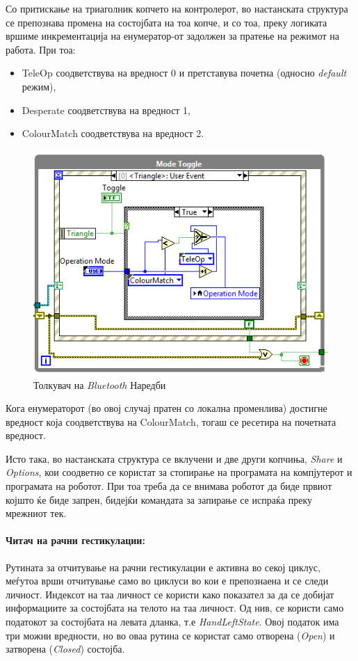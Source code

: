 \documentclass[12pt]{article}
\begin{document}
      Со притискање на триаголник копчето на контролерот, во настанската структура се препознава промена на состојбата на тоа копче, и со тоа, преку логиката вршиме инкрементација на енумератор-от задолжен за пратење на режимот на работа. При тоа:

      \begin{itemize}
        \item TeleOp соодветствува на вредност 0 и претставува почетна (односно \textit{default} режим),
        \item Desperate соодветствува на вредност 1,
        \item ColourMatch соодветствува на вредност 2.
        \end{itemize}

      \begin{figure}[H]
        \centering
        \includegraphics[width=0.75\linewidth]{./images/mode_switch.png}
        \caption{Толкувач на \textit{Bluetooth} Наредби}
        \end{figure}

      Кога енумераторот (во овој случај пратен со локална променлива) достигне вредност која соодветствува на ColourMatch, тогаш се ресетира на почетната вредност.

      Исто така, во настанската структура се вклучени и две други копчиња, \textit{Share} и \textit{Options}, кои соодветно се користат за стопирање на програмата на компјутерот и програмата на роботот. При тоа треба да се внимава роботот да биде првиот којшто ќе биде запрен, бидејќи командата за запирање се испраќа преку мрежниот тек.

    \paragraph{Читач на рачни гестикулации:\\}
      Рутината за отчитување на рачни гестикулации е активна во секој циклус, меѓутоа врши отчитување само во циклуси во кои е препознаена и се следи личност. Индексот на таа личност се користи како показател за да се добијат информациите за состојбата на телото на таа личност. Од нив, се користи само податокот за состојбата на левата дланка, т.е \textit{HandLeftState}. Овој податок има три можни вредности, но во оваа рутина се користат само отворена (\textit{Open}) и затворена (\textit{Closed}) состојба.
\end{document}
